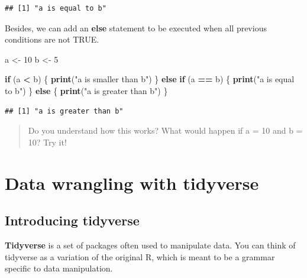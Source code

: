 \documentclass[
]{book}
\newenvironment{Shaded}{\begin{snugshade}}{\end{snugshade}}
\newcommand{\ControlFlowTok}[1]{\textcolor[rgb]{0.13,0.29,0.53}{\textbf{#1}}}
\newcommand{\DecValTok}[1]{\textcolor[rgb]{0.00,0.00,0.81}{#1}}
\newcommand{\FunctionTok}[1]{\textcolor[rgb]{0.13,0.29,0.53}{\textbf{#1}}}
\newcommand{\NormalTok}[1]{#1}
\newcommand{\OtherTok}[1]{\textcolor[rgb]{0.56,0.35,0.01}{#1}}
\newcommand{\SpecialCharTok}[1]{\textcolor[rgb]{0.81,0.36,0.00}{\textbf{#1}}}
\newcommand{\StringTok}[1]{\textcolor[rgb]{0.31,0.60,0.02}{#1}}
\begin{document}
\begin{verbatim}
## [1] "a is equal to b"
\end{verbatim}

Besides, we can add an \textbf{else} statement to be executed when all previous conditions are not TRUE.

\begin{Shaded}
\begin{Highlighting}[]
\NormalTok{a }\OtherTok{\textless{}{-}} \DecValTok{10}
\NormalTok{b }\OtherTok{\textless{}{-}} \DecValTok{5}

\ControlFlowTok{if}\NormalTok{ (a }\SpecialCharTok{\textless{}}\NormalTok{ b) \{}
  \FunctionTok{print}\NormalTok{(}\StringTok{"a is smaller than b"}\NormalTok{)}
\NormalTok{\} }\ControlFlowTok{else} \ControlFlowTok{if}\NormalTok{ (a }\SpecialCharTok{==}\NormalTok{ b) \{}
  \FunctionTok{print}\NormalTok{(}\StringTok{"a is equal to b"}\NormalTok{)}
\NormalTok{\} }\ControlFlowTok{else}\NormalTok{ \{}
  \FunctionTok{print}\NormalTok{(}\StringTok{"a is greater than b"}\NormalTok{)}
\NormalTok{\}}
\end{Highlighting}
\end{Shaded}

\begin{verbatim}
## [1] "a is greater than b"
\end{verbatim}

\begin{quote}
Do you understand how this works?
What would happen if a = 10 and b = 10?
Try it!
\end{quote}

\hypertarget{data-wrangling-with-tidyverse}{%
\section*{Data wrangling with tidyverse}\label{data-wrangling-with-tidyverse}}

\hypertarget{introducing-tidyverse}{%
\subsection*{Introducing tidyverse}\label{introducing-tidyverse}}

\textbf{Tidyverse} is a set of packages often used to manipulate data.
You can think of tidyverse as a variation of the original R, which is meant to be a grammar specific to data manipulation.
\end{document}
